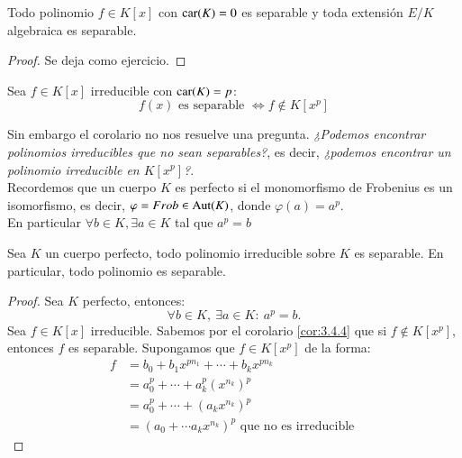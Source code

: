 \begin{lm}\label{lm:3.4.3}
    Todo polinomio $f \in K[x]$ con $\mathrm{car}(K) = 0$ es separable y toda extensión $E/K$ algebraica es separable.
\end{lm}
\begin{proof}
    Se deja como ejercicio.
\end{proof}

\begin{cor}\label{cor:3.4.4}
    Sea $f \in K[x]$ irreducible con $\mathrm{car}(K) = p$:
    $$
        f(x) \text{ es separable } \iff f \notin K[x^p]
    $$
\end{cor}

Sin embargo el corolario no nos resuelve una pregunta. \textit{¿Podemos encontrar polinomios irreducibles que no sean separables?}, es decir, \textit{ ¿podemos encontrar un polinomio irreducible en $K[x^p]$?}.\\

Recordemos que un cuerpo $K$ es perfecto si el monomorfismo de Frobenius es un isomorfismo, es decir, $\varphi = Frob \in \mathrm{Aut}(K)$, donde $\varphi(a) = a^p$.\\
En particular $\forall b \in K, \exists a \in K$ tal que $a^p = b$

\begin{thm}\label{thm:3.4.5}
    Sea $K$ un cuerpo perfecto, todo polinomio irreducible sobre $K$ es separable. En particular, todo polinomio es separable.
\end{thm}
\begin{proof}
    Sea $K$ perfecto, entonces:
    $$
        \forall b \in K,\ \exists a \in K:\ a^p = b.
    $$
    Sea $f\in K[x]$ irreducible. Sabemos por el corolario \ref{cor:3.4.4} que si $f \notin K[x^p]$, entonces $f$ es separable. Supongamos que $f \in K[x^p]$ de la forma:
    \begin{align*}
        f &= b_0 + b_1 x^{pn_1} + \cdots + b_k x^{pn_k}\\
          &= a_0^p + \cdots + a_k^p (x^{n_k})^p\\
          &= a_0^p + \cdots + (a_k x^{n_k})^p\\
          &= (a_0 + \cdots a_k x^{n_k})^p \text{ que no es irreducible }
    \end{align*}
\end{proof}

